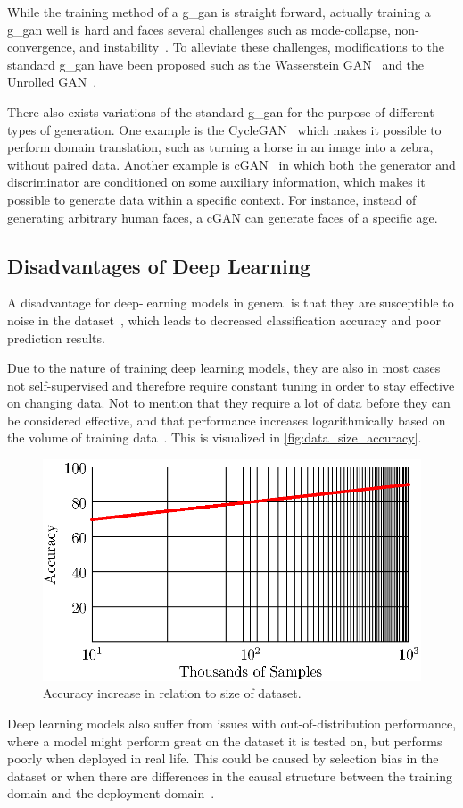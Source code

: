While the training method of a \gls*{g_gan} is straight forward, actually training a \gls*{g_gan} well is hard and faces several challenges such as mode-collapse, non-convergence, and instability~\cite{gan_challenges,gan_challenges2}. To alleviate these challenges, modifications to the standard \gls*{g_gan} have been proposed such as the Wasserstein GAN~\cite{wgan} and the Unrolled GAN~\cite{unrolled_gan}.
\par
There also exists variations of the standard \gls*{g_gan} for the purpose of different types of generation. One example is the CycleGAN~\cite{CycleGAN} which makes it possible to perform domain translation, such as turning a horse in an image into a zebra, without paired data. Another example is cGAN~\cite{cgan}  in which both the generator and discriminator are conditioned on some auxiliary information, which makes it possible to generate data within a specific context. For instance, instead of generating arbitrary human faces, a cGAN can generate faces of a specific age.
\subsection{Disadvantages of Deep Learning}
A disadvantage for deep-learning models in general is that they are susceptible to noise in the dataset~\cite{noise1,noise2}, which leads to decreased classification accuracy and poor prediction results.
\par
Due to the nature of training deep learning models, they are also in most cases not self-supervised and therefore require constant tuning in order to stay effective on changing data. Not to mention that they require a lot of data before they can be considered effective, and that performance increases logarithmically based on the volume of training data~\cite{deeplearning_dataset}. This is visualized in \autoref{fig:data_size_accuracy}.
\begin{figure}[H]
    \centering
    \includegraphics[width=0.8\linewidth]{resources/related_works/training_volume}
    \caption[Dataset Volume Accuracy]{Accuracy increase in relation to size of dataset.}
    \label{fig:data_size_accuracy}
\end{figure}
Deep learning models also suffer from issues with out-of-distribution performance, where a model might perform great on the dataset it is tested on, but performs poorly when deployed in real life. This could be caused by selection bias in the dataset or when there are differences in the causal structure between the training domain and the deployment domain~\cite{deeplearning_ood}.
